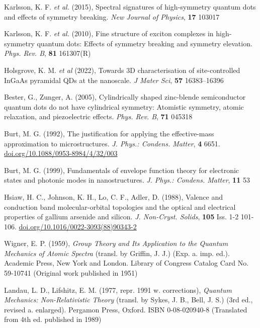 \documentclass[12pt]{article}
\begin{document}
\begin{thebibliography}{10}

Karlsson, K. F. \textit{et al.} (2015), Spectral signatures of high-symmetry quantum dots and effects of symmetry breaking. \textit{New Journal of Physics}, \textbf{17} 103017

Karlsson, K. F. \textit{et al.} (2010), Fine structure of exciton complexes in high-symmetry quantum dots: Effects of symmetry breaking and symmetry elevation. \textit{Phys. Rev. B}, \textbf{81} 161307(R)

Holsgrove, K. M. \textit{et al} (2022), Towards 3D characterisation of site-controlled InGaAs pyramidal QDs at the nanoscale. \textit{J Mater Sci}, \textbf{57} 16383--16396

Bester, G., Zunger, A. (2005), Cylindrically shaped zinc-blende semiconductor quantum dots do not have cylindrical symmetry: Atomistic symmetry, atomic relaxation, and piezoelectric effects. \textit{Phys. Rev. B}, \textbf{71} 045318

Burt, M. G. (1992), The justification for applying the effective-mass approximation to microstructures. \textit{J. Phys.: Condens. Matter}, \textbf{4} 6651. \href{https://doi.org/10.1088/0953-8984/4/32/003}{doi.org/10.1088/0953-8984/4/32/003}

Burt, M. G. (1999), Fundamentals of envelope function theory for electronic states and photonic modes in nanostructures. \textit{J. Phys.: Condens. Matter}, \textbf{11} 53

Hsiaw, H. C., Johnson, K. H., Lo, C. F., Adler, D. (1988), Valence and conduction band molecular-orbital topologies and the optical and electrical properties of gallium arsenide and silicon. \textit{J. Non-Cryst. Solids}, \textbf{105} Iss. 1-2 101-106. \href{https://doi.org/10.1016/0022-3093(88)90343-2}{doi.org/10.1016/0022-3093(88)90343-2}

Wigner, E. P. (1959), \textit{Group Theory and Its Application to the Quantum Mechanics of Atomic Spectra} (transl. by Griffin, J. J.) (Exp. a. imp. ed.). Academic Press, New York and London. Library of Congress Catalog Card No. 59-10741 (Original work published in 1951)

Landau, L. D., Lifshitz, E. M. (1977, repr. 1991 w. corrections), \textit{Quantum Mechanics: Non-Relativistic Theory} (transl. by Sykes, J. B., Bell, J. S.) (3rd ed., revised a. enlarged). Pergamon Press, Oxford. ISBN 0-08-020940-8 (Translated from 4th ed. published in 1989)


\end{thebibliography}
\end{document}
